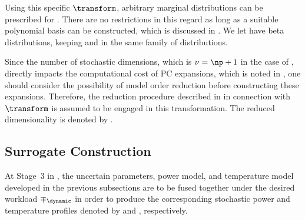 Using this specific $\transform$, arbitrary marginal distributions can be
prescribed for \vz. There are no restrictions in this regard as long as a
suitable polynomial basis can be constructed, which is discussed in
. We let \vz have beta distributions, keeping \vu and
\vz in the same family of distributions.

Since the number of stochastic dimensions, which is $\nu = \np + 1$ in the case
of \vu, directly impacts the computational cost of \ac{PC} expansions, which is
noted in , one should consider the possibility of model
order reduction before constructing these expansions. Therefore, the reduction
procedure described in  in connection with
$\transform$ is assumed to be engaged in this transformation. The reduced
dimensionality is denoted by \nz.

\subsection{Surrogate Construction}

At Stage~3 in , the uncertain parameters, power model, and
temperature model developed in the previous subsections are to be fused together
under the desired workload $\mp_\dynamic$ in order to produce the corresponding
stochastic power and temperature profiles denoted by \mp and \mq, respectively.


